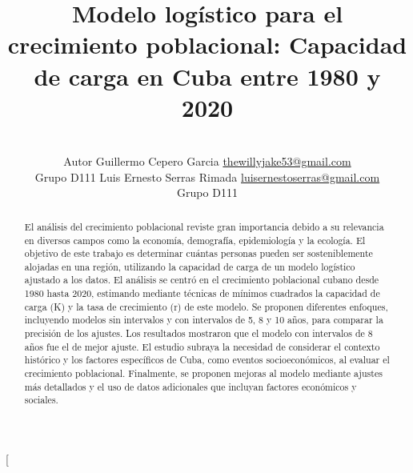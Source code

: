 \documentclass[a4paper,10pt,twocolumn]{article}
\title{Modelo logístico para el crecimiento poblacional: Capacidad de carga en Cuba entre 1980 y 2020}
\author{\\
\name Autor Guillermo Cepero Garcia \email \href{mailto:thewillyjake53@gmail.com}{thewillyjake53@gmail.com}
	\\ \addr Grupo D111 \AND
\name Luis Ernesto Serras Rimada \email \href{mailto:luisernestoserras@gmail.com}{luisernestoserras@gmail.com}
  \\ \addr Grupo D111}
\begin{document}
\twocolumn[

\maketitle


\begin{abstract}

	El análisis del crecimiento poblacional reviste gran importancia debido a su relevancia en diversos campos como
	la economía, demografía, epidemiología y la ecología. El objetivo de este trabajo es determinar cuántas personas 
	pueden ser sosteniblemente alojadas en una región, utilizando la capacidad de carga de un modelo logístico ajustado 
	a los datos. El análisis se centró en el crecimiento poblacional cubano desde 1980 hasta 2020, estimando mediante técnicas 
	de mínimos cuadrados la capacidad de carga (K) y la tasa de crecimiento (r) de este modelo. Se proponen diferentes enfoques, 
	incluyendo modelos sin intervalos y con intervalos de 5, 8 y 10 años, para comparar la precisión de los ajustes. Los resultados 
	mostraron que el modelo con intervalos de 8 años fue el de mejor ajuste. El estudio subraya la necesidad de considerar el 
	contexto histórico y los factores específicos de Cuba, como eventos socioeconómicos, al evaluar el crecimiento poblacional. 
	Finalmente, se proponen mejoras al modelo mediante ajustes más detallados y el uso de datos adicionales que incluyan factores económicos y sociales.

\end{abstract}

\vspace{0.5cm}
\end{document}

